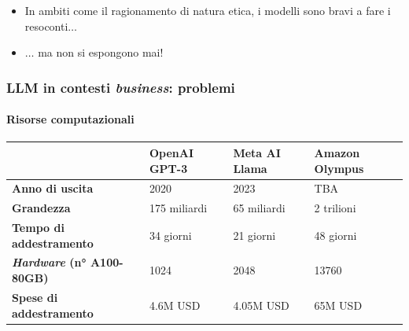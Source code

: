\begin{frame}[t]
{\begin{minipage}[t]{\textwidth}
\begin{figure}
        \end{figure}
    \end{minipage}
    \begin{minipage}[b]{\textwidth}
        \vspace*{.3cm}
        \begin{itemize}[leftmargin=10pt,align=right]
            \item[\alert{\faArrowCircleRight}] In ambiti come il ragionamento di natura etica, i modelli sono bravi a fare i resoconti$\ldots$
            \item[\alert{\faArrowCircleRight}] $\ldots$ ma non si espongono mai!
        \end{itemize}
    \end{minipage}
}
\end{frame}
%
\begin{frame}[t] \frametitle{LLM in contesti \emph{business}: problemi}
\framesubtitle{Risorse computazionali}
{\scriptsize
{}
    \begin{minipage}[t]{\textwidth}
    {\scriptsize
    \vspace*{-.5cm}
        \begin{table}
            \renewcommand{\arraystretch}{1}
            \centering
            \begin{tabularx}{\textwidth}{Xp{1.7cm}p{1.7cm}p{2cm}}
                \toprule
                & \textbf{OpenAI GPT-3} & \textbf{Meta AI Llama} & \textbf{Amazon Olympus}\\
                \midrule
                \textbf{Anno di uscita} & 2020 & 2023 & TBA\\
                \textbf{Grandezza} & 175 miliardi & 65 miliardi & 2 trilioni\\
                \textbf{Tempo di addestramento} & 34 giorni & 21 giorni & 48 giorni\\
                \textbf{\emph{Hardware} (n° A100-80GB)} & 1024 & 2048 & 13760\\
                \textbf{Spese di addestramento} & 4.6M USD & 4.05M USD & 65M USD\\
                \bottomrule
            \end{tabularx}
        \end{table}
    }
    \end{minipage}
    \begin{minipage}[b]{\textwidth}
\end{minipage}}
\end{frame}
